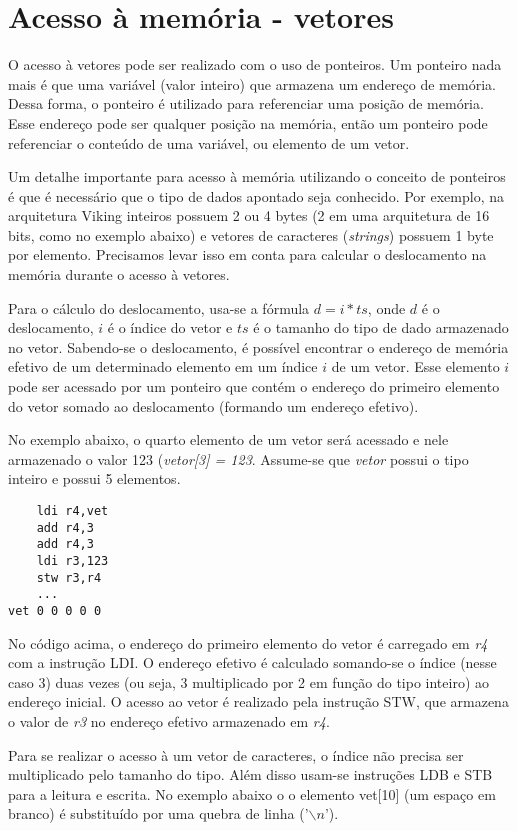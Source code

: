 \documentclass{extreport}
\begin{document}
\section{Acesso à memória - vetores}

O acesso à vetores pode ser realizado com o uso de ponteiros. Um ponteiro nada mais é que uma variável (valor inteiro) que armazena um endereço de memória. Dessa forma, o ponteiro é utilizado para referenciar uma posição de memória. Esse endereço pode ser qualquer posição na memória, então um ponteiro pode referenciar o conteúdo de uma variável, ou elemento de um vetor.

Um detalhe importante para acesso à memória utilizando o conceito de ponteiros é que é necessário que o tipo de dados apontado seja conhecido. Por exemplo, na arquitetura Viking inteiros possuem 2 ou 4 bytes (2 em uma arquitetura de 16 bits, como no exemplo abaixo) e vetores de caracteres (\textit{strings}) possuem 1 byte por elemento. Precisamos levar isso em conta para calcular o deslocamento na memória durante o acesso à vetores.

Para o cálculo do deslocamento, usa-se a fórmula $d = i * ts$, onde $d$ é o deslocamento, $i$ é o índice do vetor e $ts$ é o tamanho do tipo de dado armazenado no vetor. Sabendo-se o deslocamento, é possível encontrar o endereço de memória efetivo de um determinado elemento em um índice $i$ de um vetor. Esse elemento $i$ pode ser acessado por um ponteiro que contém o endereço do primeiro elemento do vetor somado ao deslocamento (formando um endereço efetivo).

No exemplo abaixo, o quarto elemento de um vetor será acessado e nele armazenado o valor 123 (\textit{vetor[3] = 123}. Assume-se que \textit{vetor} possui o tipo inteiro e possui 5 elementos.

\begin{verbatim}
    ldi r4,vet
    add r4,3
    add r4,3
    ldi r3,123
    stw r3,r4
    ...
vet 0 0 0 0 0
\end{verbatim}

No código acima, o endereço do primeiro elemento do vetor é carregado em \textit{r4} com a instrução LDI. O endereço efetivo é calculado somando-se o índice (nesse caso 3) duas vezes (ou seja, 3 multiplicado por 2 em função do tipo inteiro) ao endereço inicial. O acesso ao vetor é realizado pela instrução STW, que armazena o valor de \textit{r3} no endereço efetivo armazenado em \textit{r4}.

Para se realizar o acesso à um vetor de caracteres, o índice não precisa ser multiplicado pelo tamanho do tipo. Além disso usam-se instruções LDB e STB para a leitura e escrita. No exemplo abaixo o o elemento vet[10] (um espaço em branco) é substituído por uma quebra de linha ('$\backslash n$').
\end{document}
